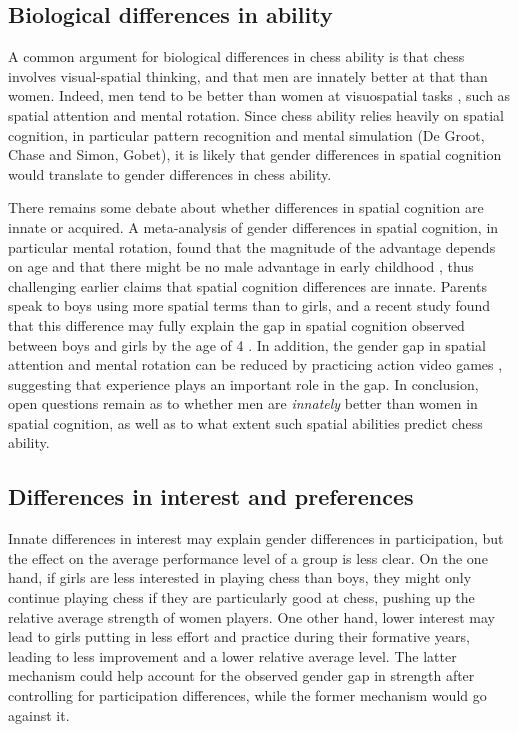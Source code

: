 \documentclass[9pt,twocolumn,twoside,lineno]{pnas-new}
\begin{document}
\subsection*{Biological differences in ability}
A common argument for biological differences in chess ability is that chess involves visual-spatial thinking, and that men are innately better at that than women. Indeed, men tend to be better than women at visuospatial tasks \cite{kimura1999sex, terlecki2005important, voyer1995magnitude}, such as spatial attention and mental rotation.  Since chess ability relies heavily on spatial cognition, in particular pattern recognition and mental simulation (De Groot, Chase and Simon, Gobet), it is likely that gender differences in spatial cognition would translate to gender differences in chess ability. 

There remains some debate about whether differences in spatial cognition are innate or acquired. A meta-analysis of gender differences in spatial cognition, in particular mental rotation, found that the magnitude of the advantage depends on age and that there might be no male advantage in early childhood \cite{lauer2019development}, thus challenging earlier claims that spatial cognition differences are innate. Parents speak to boys using more spatial terms than to girls, and a recent study found that this difference may fully explain the gap in spatial cognition observed between boys and girls by the age of 4 \cite{pruden2017}. In addition, the gender gap in spatial attention and mental rotation can be reduced by practicing action video games \cite{feng2007playing}, suggesting that experience plays an important role in the gap. In conclusion, open questions remain as to whether men are {\it innately} better than women in spatial cognition, as well as to what extent such spatial abilities predict chess ability.

\subsection*{Differences in interest and preferences}
Innate differences in interest may explain gender differences in participation, but the effect on the average performance level of a group is less clear. On the one hand, if girls are less interested in playing chess than boys, they might only continue playing chess if they are particularly good at chess, pushing up the relative average strength of women players. One other hand, lower interest may lead to girls putting in less effort and practice during their formative years, leading to less improvement and a lower relative average level. The latter mechanism could help account for the observed gender gap in strength after controlling for participation differences, while the former mechanism would go against it. 
\end{document}
